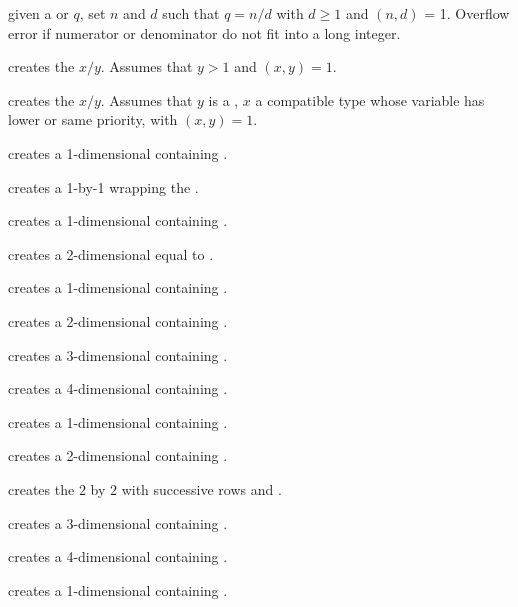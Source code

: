  given a  or  $q$,
set $n$ and $d$ such that $q = n/d$ with $d \geq 1$ and $(n,d)$ = 1. Overflow
error if numerator or denominator do not fit into a long integer.

 creates the  $x/y$. Assumes that
$y > 1$ and $(x,y) = 1$.

 creates the  $x/y$.
Assumes that $y$ is a , $x$ a compatible type whose variable has
lower or same priority, with $(x,y) = 1$.

 creates a 1-dimensional  containing
.

 creates a 1-by-1  wrapping the 
.

 creates a 1-dimensional  containing
.

 creates a 2-dimensional  equal
to \kbd{[x,y]}.

 creates a 1-dimensional 
containing .

 creates a 2-dimensional 
containing .

 creates a 3-dimensional 
containing .

 creates a 4-dimensional
 containing .

 creates a 1-dimensional 
containing .

 creates a 2-dimensional 
containing .

 creates the $2$ by $2$
 with successive rows  and
.

 creates a 3-dimensional 
containing .

 creates a 4-dimensional
 containing .

 creates a 1-dimensional 
containing .


